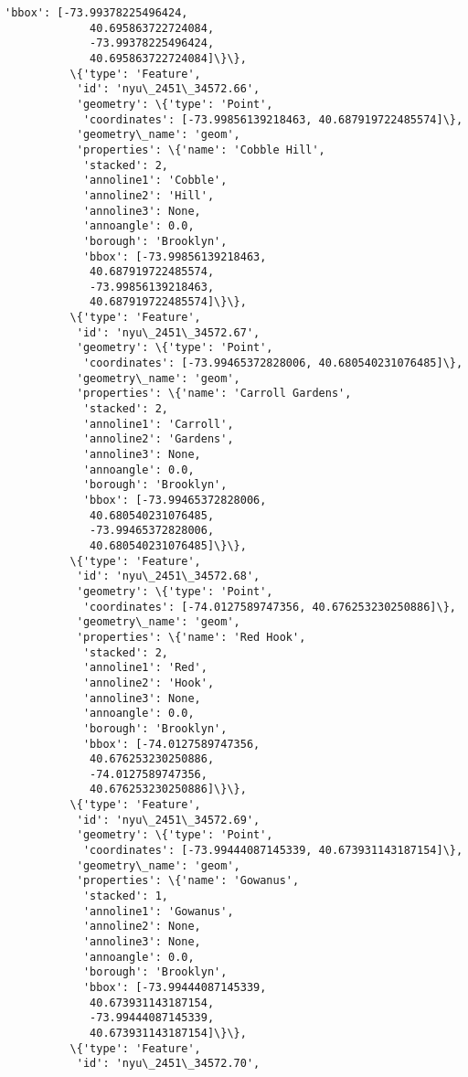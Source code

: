\documentclass[11pt]{article}
\begin{document}
\begin{Verbatim}[commandchars=\\\{\}]
            'bbox': [-73.99378225496424,
             40.695863722724084,
             -73.99378225496424,
             40.695863722724084]\}\},
          \{'type': 'Feature',
           'id': 'nyu\_2451\_34572.66',
           'geometry': \{'type': 'Point',
            'coordinates': [-73.99856139218463, 40.687919722485574]\},
           'geometry\_name': 'geom',
           'properties': \{'name': 'Cobble Hill',
            'stacked': 2,
            'annoline1': 'Cobble',
            'annoline2': 'Hill',
            'annoline3': None,
            'annoangle': 0.0,
            'borough': 'Brooklyn',
            'bbox': [-73.99856139218463,
             40.687919722485574,
             -73.99856139218463,
             40.687919722485574]\}\},
          \{'type': 'Feature',
           'id': 'nyu\_2451\_34572.67',
           'geometry': \{'type': 'Point',
            'coordinates': [-73.99465372828006, 40.680540231076485]\},
           'geometry\_name': 'geom',
           'properties': \{'name': 'Carroll Gardens',
            'stacked': 2,
            'annoline1': 'Carroll',
            'annoline2': 'Gardens',
            'annoline3': None,
            'annoangle': 0.0,
            'borough': 'Brooklyn',
            'bbox': [-73.99465372828006,
             40.680540231076485,
             -73.99465372828006,
             40.680540231076485]\}\},
          \{'type': 'Feature',
           'id': 'nyu\_2451\_34572.68',
           'geometry': \{'type': 'Point',
            'coordinates': [-74.0127589747356, 40.676253230250886]\},
           'geometry\_name': 'geom',
           'properties': \{'name': 'Red Hook',
            'stacked': 2,
            'annoline1': 'Red',
            'annoline2': 'Hook',
            'annoline3': None,
            'annoangle': 0.0,
            'borough': 'Brooklyn',
            'bbox': [-74.0127589747356,
             40.676253230250886,
             -74.0127589747356,
             40.676253230250886]\}\},
          \{'type': 'Feature',
           'id': 'nyu\_2451\_34572.69',
           'geometry': \{'type': 'Point',
            'coordinates': [-73.99444087145339, 40.673931143187154]\},
           'geometry\_name': 'geom',
           'properties': \{'name': 'Gowanus',
            'stacked': 1,
            'annoline1': 'Gowanus',
            'annoline2': None,
            'annoline3': None,
            'annoangle': 0.0,
            'borough': 'Brooklyn',
            'bbox': [-73.99444087145339,
             40.673931143187154,
             -73.99444087145339,
             40.673931143187154]\}\},
          \{'type': 'Feature',
           'id': 'nyu\_2451\_34572.70',

\end{Verbatim}
\end{document}
